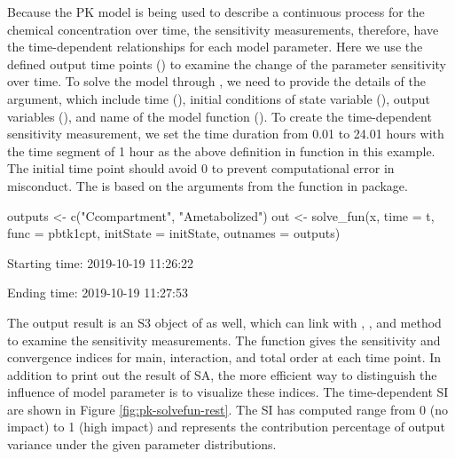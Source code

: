 Because the PK model is being used to describe a continuous process for
the chemical concentration over time, the sensitivity measurements,
therefore, have the time-dependent relationships for each model
parameter. Here we use the defined output time points () to
examine the change of the parameter sensitivity over time. To solve the
model through , we need to provide the details of the
argument, which include time (), initial conditions of state
variable (), output variables (), and
name of the model function (). To create the time-dependent
sensitivity measurement, we set the time duration from 0.01 to 24.01
hours with the time segment of 1 hour as the above definition in
 function in this example. The initial time point should avoid
0 to prevent computational error in misconduct. The  is
based on the arguments from the  function in 
package.

\begin{Schunk}
\begin{Sinput}
outputs <- c("Ccompartment", "Ametabolized")
out <- solve_fun(x, time = t, func = pbtk1cpt, 
                 initState = initState, outnames = outputs)
\end{Sinput}
\begin{Soutput}
  Starting time: 2019-10-19 11:26:22
\end{Soutput}
\begin{Soutput}
  Ending time: 2019-10-19 11:27:53
\end{Soutput}
\end{Schunk}

The output result  is an S3 object of  as well,
which can link with , , and  method
to examine the sensitivity measurements. The  function gives
the sensitivity and convergence indices for main, interaction, and total
order at each time point. In addition to print out the result of SA, the
more efficient way to distinguish the influence of model parameter is to
visualize these indices. The time-dependent SI are shown in Figure
\ref{fig:pk-solvefun-rest}. The SI has computed range from 0 (no impact)
to 1 (high impact) and represents the contribution percentage of output
variance under the given parameter distributions.

